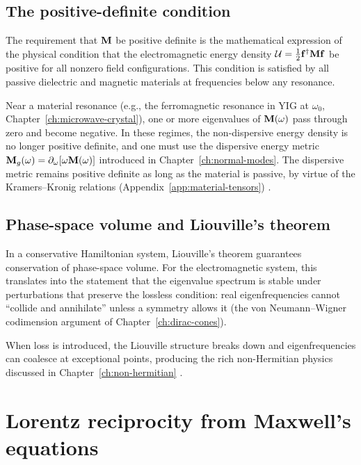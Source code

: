 \subsection{The positive-definite condition}
\label{sec:ch2-positive-definite}

The requirement that $\mathbf{M}$ be positive definite is the mathematical
expression of the physical condition that the electromagnetic energy
density $\mathcal{U}=\frac{1}{2}\mathbf{f}^\dagger\mathbf{M}\mathbf{f}$ be
positive for all nonzero field configurations.  This condition is
satisfied by all passive dielectric and magnetic materials at
frequencies below any resonance.

Near a material resonance (e.g., the ferromagnetic resonance in YIG
at $\omega_0$, Chapter~\ref{ch:microwave-crystal}), one or more
eigenvalues of $\mathbf{M}(\omega)$ pass through zero and become negative.
In these regimes, the non-dispersive energy density is no longer
positive definite, and one must use the dispersive energy metric
$\mathbf{M}_g(\omega)=\partial_\omega[\omega\mathbf{M}(\omega)]$ introduced in
Chapter~\ref{ch:normal-modes}.  The dispersive metric remains
positive definite as long as the material is passive, by virtue of
the Kramers--Kronig relations (Appendix~\ref{app:material-tensors})
\cite{gangaraj2016berry,silveirinha2016bulk}.

\subsection{Phase-space volume and Liouville's theorem}
\label{sec:ch2-liouville}

In a conservative Hamiltonian system, Liouville's theorem guarantees
conservation of phase-space volume.  For the electromagnetic system,
this translates into the statement that the eigenvalue spectrum is
stable under perturbations that preserve the lossless condition: real
eigenfrequencies cannot ``collide and annihilate'' unless a symmetry
allows it (the von Neumann--Wigner codimension argument of
Chapter~\ref{ch:dirac-cones}).

When loss is introduced, the Liouville structure breaks down and
eigenfrequencies can coalesce at exceptional points, producing the
rich non-Hermitian physics discussed in
Chapter~\ref{ch:non-hermitian} \cite{price2022roadmap}.

\section{Lorentz reciprocity from Maxwell's equations}
\label{sec:ch2-reciprocity-lorentz}

